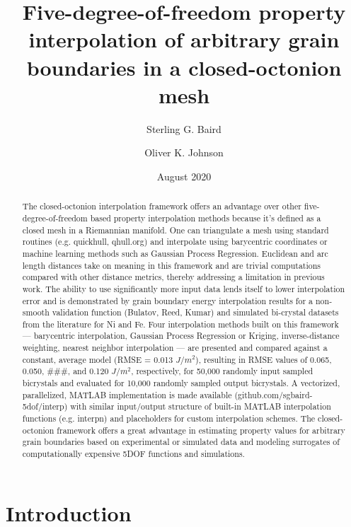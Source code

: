 \documentclass[preprint,12pt]{elsarticle}
\title{Five-degree-of-freedom property interpolation of arbitrary grain boundaries in a closed-octonion mesh}
\author{Sterling G. Baird}
\author{Oliver K. Johnson}
\date{August 2020}
\begin{document}
\begin{abstract}
    The closed-octonion interpolation framework offers an advantage over other five-degree-of-freedom based property interpolation methods because it's defined as a closed mesh in a Riemannian manifold. One can triangulate a mesh using standard routines (e.g. quickhull, qhull.org) and interpolate using barycentric coordinates or machine learning methods such as Gaussian Process Regression. Euclidean and arc length distances take on meaning in this framework and are trivial computations compared with other distance metrics, thereby addressing a limitation in previous work. The ability to use significantly more input data lends itself to lower interpolation error and is demonstrated by grain boundary energy interpolation results for a non-smooth validation function (Bulatov, Reed, Kumar) and simulated bi-crystal datasets from the literature for Ni and Fe. Four interpolation methods built on this framework --- barycentric interpolation, Gaussian Process Regression or Kriging, inverse-distance weighting, nearest neighbor interpolation --- are presented and compared against a constant, average model (RMSE = 0.013 $J/m^2$), resulting in RMSE values of 0.065, 0.050, ###, and 0.120 $J/m^2$, respectively, for 50,000 randomly input sampled bicrystals and evaluated for 10,000 randomly sampled output bicrystals. A vectorized, parallelized, MATLAB implementation is made available (github.com/sgbaird-5dof/interp) with similar input/output structure of built-in MATLAB interpolation functions (e.g. interpn) and placeholders for custom interpolation schemes. The closed-octonion framework offers a great advantage in estimating property values for arbitrary grain boundaries based on experimental or simulated data and modeling surrogates of computationally expensive 5DOF functions and simulations.
\end{abstract}

\maketitle

\section{Introduction} \label{sec:intro}
\end{document}

